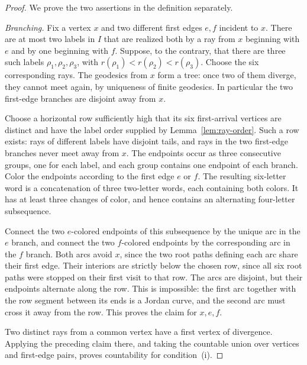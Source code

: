 \begin{proof}
We prove the two assertions in the definition separately.

\emph{Branching.}
Fix a vertex $x$ and two different first edges $e,f$ incident to $x$.
There are at most two labels in $I$ that are realized both by a ray
from $x$ beginning with $e$ and by one beginning with $f$.  Suppose,
to the contrary, that there are three such labels
$\rho_1,\rho_2,\rho_3$, with
$r(\rho_1)<r(\rho_2)<r(\rho_3)$.  Choose the six corresponding rays.
The geodesics from $x$ form a tree: once two of them diverge, they
cannot meet again, by uniqueness of finite geodesics.  In particular
the two first-edge branches are disjoint away from $x$.

Choose a horizontal row sufficiently high that its six first-arrival
vertices are distinct and have the label order supplied by
Lemma~\ref{lem:ray-order}.  Such a row exists: rays of different
labels have disjoint tails, and rays in the two first-edge branches
never meet away from $x$.  The endpoints occur as three consecutive
groups, one for each label, and each group contains one endpoint of
each branch.  Color the endpoints according to the first edge $e$ or
$f$.  The resulting six-letter word is a concatenation of three
two-letter words, each containing both colors.  It has at least three
changes of color, and hence contains an alternating four-letter
subsequence.

Connect the two $e$-colored endpoints of this subsequence by the
unique arc in the $e$ branch, and connect the two $f$-colored endpoints
by the corresponding arc in the $f$ branch.  Both arcs avoid $x$,
since the two root paths defining each arc share their first edge.
Their interiors are strictly below the chosen row, since all six
root paths were stopped on their first visit to that row.  The arcs
are disjoint, but their endpoints alternate along the row.  This is
impossible: the first arc together with the row segment between its
ends is a Jordan curve, and the second arc must cross it away from
the row.  This proves the claim for $x,e,f$.

Two distinct rays from a common vertex have a first vertex of
divergence.  Applying the preceding claim there, and taking the
countable union over vertices and first-edge pairs, proves
countability for condition~(i).


\end{proof}

